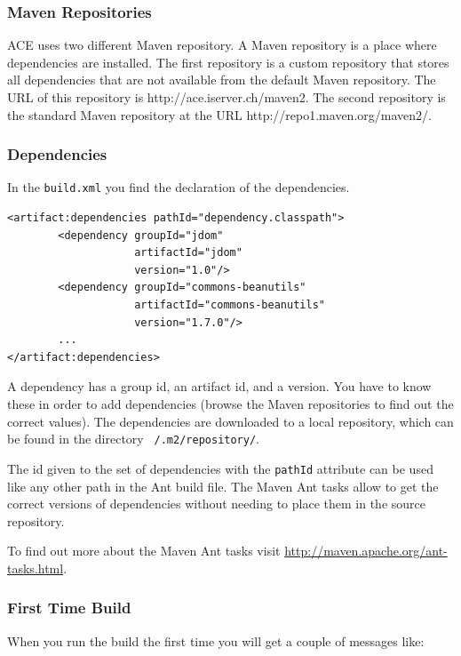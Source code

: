 \documentclass[11pt,a4paper]{article}
\begin{document}
\subsubsection{Maven Repositories}
ACE uses two different Maven repository. A Maven repository is a place where
dependencies are installed. The first repository is a custom repository that
stores all dependencies that are not available from the default Maven
repository. The URL of this repository is http://ace.iserver.ch/maven2. The
second repository is the standard Maven repository at the URL
http://repo1.maven.org/maven2/.

\subsubsection{Dependencies}
In the \texttt{build.xml} you find the declaration of the dependencies.

\small{
\begin{verbatim}
<artifact:dependencies pathId="dependency.classpath">
		<dependency groupId="jdom" 
		            artifactId="jdom" 
		            version="1.0"/>
		<dependency groupId="commons-beanutils" 
		            artifactId="commons-beanutils" 
		            version="1.7.0"/>
        ...
</artifact:dependencies>
\end{verbatim}
}

A dependency has a group id, an artifact id, and a version. You have to know
these in order to add dependencies (browse the Maven repositories to find
out the correct values). The dependencies are downloaded to a local repository,
which can be found in the directory \texttt{~/.m2/repository/}.

The id given to the set of dependencies with the \texttt{pathId} attribute
can be used like any other path in the Ant build file. The Maven Ant tasks
allow to get the correct versions of dependencies without needing to place
them in the source repository.

To find out more about the Maven Ant tasks visit
\href{http://maven.apache.org/ant-tasks.html}{http://maven.apache.org/ant-tasks.html}.

\subsubsection{First Time Build}
When you run the build the first time you will get a couple of messages like:

\end{document}
